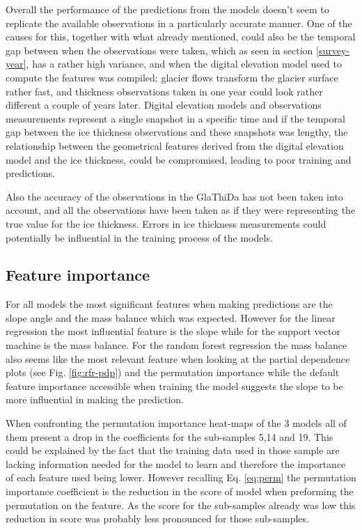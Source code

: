 Overall the performance of the predictions from the models doesn't seem to replicate the available observations in a particularly accurate manner. One of the causes for this, together with what already mentioned, could also be the temporal gap between when the observations were taken, which as seen in section \ref{survey-year}, has a rather high variance, and when the digital elevation model used to compute the features was compiled; glacier flows transform the glacier surface rather fast, and thickness observations taken in one year could look rather different a couple of years later. Digital elevation models and observations measurements represent a single snapshot in a specific time and if the temporal gap between the ice thickness observations and these snapshots was lengthy, the relationship between the geometrical features derived from the digital elevation model and the ice thickness, could be compromised, leading to poor training and predictions.

Also the accuracy of the observations in the GlaThiDa has not been taken into account, and all the observations have been taken as if they were representing the true value for the ice thickness. Errors in ice thickness measurements could potentially be influential in the training process of the models. 

\subsection{Feature importance}\label{disc-features}
For all models the most significant features when making predictions are the slope angle and the mass balance which was expected. However for the linear regression the most influential feature is the slope while for the support  vector machine is the mass balance. For the random forest regression the mass balance also seems like the most relevant feature when looking at the partial dependence plots (see Fig. \ref{fig:rfr-pdp}) and the permutation importance while the default feature importance accessible when training the model suggests the slope to be more influential in making the prediction.

When confronting the permutation importance heat-maps of the 3 models all of them present a drop in the coefficients for the sub-samples 5,14 and 19. This could be explained by the fact that the training data used in those sample are lacking information needed for the model to learn and therefore the importance of each feature used being lower. However recalling Eq. \ref{eq:perm} the permutation importance coefficient is the reduction in the score of model when preforming the permutation on the feature. As the score for the sub-samples already was low this reduction in score was probably less pronounced for those sub-samples. 

